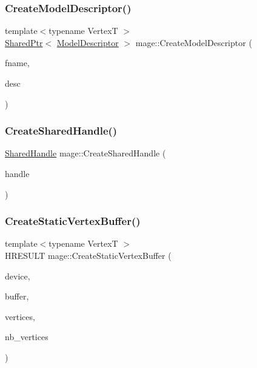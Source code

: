 \hypertarget{namespacemage_a8cc26f80d3cb6f3d457bb06942880d84}{}\label{namespacemage_a8cc26f80d3cb6f3d457bb06942880d84} 
\subsubsection{\texorpdfstring{Create\+Model\+Descriptor()}{CreateModelDescriptor()}}
{\footnotesize\ttfamily template$<$typename VertexT $>$ \\
\hyperlink{namespacemage_a1e01ae66713838a7a67d30e44c67703e}{Shared\+Ptr}$<$ \hyperlink{classmage_1_1_model_descriptor}{Model\+Descriptor} $>$ mage\+::\+Create\+Model\+Descriptor (\begin{DoxyParamCaption}\item[{const wstring \&}]{fname,  }\item[{const \hyperlink{structmage_1_1_mesh_descriptor}{Mesh\+Descriptor}$<$ VertexT $>$ \&}]{desc }\end{DoxyParamCaption})}

\hypertarget{namespacemage_a3119898d7caac71d8ee495c3ae3194b1}{}\label{namespacemage_a3119898d7caac71d8ee495c3ae3194b1} 
\subsubsection{\texorpdfstring{Create\+Shared\+Handle()}{CreateSharedHandle()}}
{\footnotesize\ttfamily \hyperlink{namespacemage_ab892828913d6129acf71e0cec60467e5}{Shared\+Handle} mage\+::\+Create\+Shared\+Handle (\begin{DoxyParamCaption}\item[{H\+A\+N\+D\+LE}]{handle }\end{DoxyParamCaption})}

\hypertarget{namespacemage_aa8500c749a1f216d07be3e996ca63b17}{}\label{namespacemage_aa8500c749a1f216d07be3e996ca63b17} 
\subsubsection{\texorpdfstring{Create\+Static\+Vertex\+Buffer()}{CreateStaticVertexBuffer()}}
{\footnotesize\ttfamily template$<$typename VertexT $>$ \\
H\+R\+E\+S\+U\+LT mage\+::\+Create\+Static\+Vertex\+Buffer (\begin{DoxyParamCaption}\item[{\hyperlink{namespacemage_ae74f374780900893caa5555d1031fd79}{Com\+Ptr}$<$ I\+D3\+D11\+Device2 $>$}]{device,  }\item[{I\+D3\+D11\+Buffer $\ast$$\ast$}]{buffer,  }\item[{const VertexT $\ast$}]{vertices,  }\item[{size\+\_\+t}]{nb\+\_\+vertices }\end{DoxyParamCaption})}

